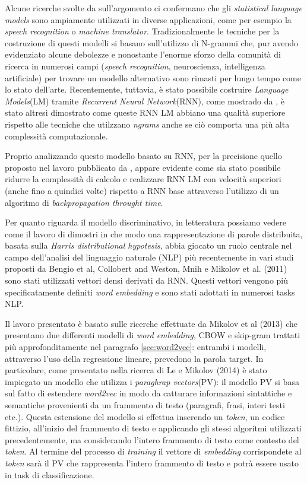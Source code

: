 \documentclass[a4paper,12pt,openright,twoside]{report}
\theoremstyle{definition}
\begin{document}
Alcune ricerche svolte da \cite{Miktesi} sull'argomento ci confermano che 
gli \emph{statistical language models} sono ampiamente utilizzati
in diverse applicazioni, come per esempio la \emph{speech recognition} o \emph{machine translator}.
Tradizionalmente le tecniche per la costruzione di questi modelli si basano sull'utilizzo di 
N-grammi che,
pur avendo evidenziato alcune debolezze e nonostante l'enorme sforzo della
comunità di ricerca in numerosi campi (\emph{speech recognition}, neuroscienza, intelligenza
artificiale) per trovare un modello alternativo sono rimasti per lungo tempo come lo stato dell'arte.
Recentemente, tuttavia, è stato possibile costruire \emph{Language Models}(LM) 
tramite \emph{Recurrent Neural Network}(RNN), come mostrado da \cite{Mik2010,MikEmp},
è stato altresì dimostrato come queste RNN LM abbiano una qualità superiore rispetto alle tecniche
che utilzzano \emph{n\-grams} anche se ciò comporta una più alta complessità computazionale.

Proprio analizzando questo modello basato su RNN, per la precisione quello
proposto nel lavoro pubblicato da \cite{MikRNN}, appare evidente come sia
stato possibile ridurre la complessità  di calcolo e realizzare RNN LM con
velocità superiori (anche fino a quindici volte) rispetto a RNN base attraverso l'utilizzo
di un algoritmo di \emph{backpropagation throught time}.

Per quanto riguarda il modello discriminativo, in letteratura possiamo vedere come il lavoro di \cite{Baroni2010}
dimostri in che modo una rappresentazione di parole distribuita, 
basata sulla \emph{Harris distributional hypotesis},
abbia giocato un ruolo centrale nel campo dell'analisi del linguaggio naturale (NLP)
più recentemente in vari studi proposti da 
Bengio et al, Collobert and Weston, Mnih e Mikolov et al. (2011) %
sono stati utilizzati vettori densi derivati da RNN. Questi vettori vengono più specificatamente
definiti \emph{word embedding} e sono stati adottati in numerosi tasks NLP.

Il lavoro presentato è basato sulle ricerche effettuate da Mikolov et al (2013) %
che presentano due differenti modelli di \emph{word embedding}, CBOW e 
skip-gram trattati più approfonditamente nel paragrafo \ref{sec:word2vec}:
entrambi i modelli,
attraverso l'uso della regressione lineare, prevedono la parola target.
In particolare, come presentato nella ricerca di Le e Mikolov (2014)%
è stato impiegato
un modello che utilizza i \emph{paraghrap vectors}(PV): il modello PV si basa sul fatto
di estendere \emph{word2vec} in modo da catturare informazioni sintattiche e semantiche 
provenienti da un frammento di testo (paragrafi, frasi, interi testi etc.).
Questa estensione del modello si effettua inserendo un \emph{token}, un codice fittizio,
all'inizio del frammento di testo e applicando gli stessi algoritmi utilizzati 
precedentemente, ma considerando l'intero frammento di testo come contesto del \emph{token}.
Al termine del processo di \emph{training} il vettore di \emph{embedding} corrispondete
al \emph{token} sarà il PV che rappresenta l'intero frammento di testo e potrà
essere usato in task di classificazione.
\end{document}
